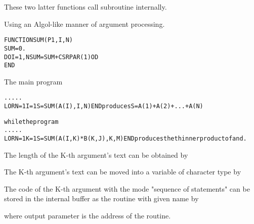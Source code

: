  
These two latter functions call subroutine   internally.
 
\Examples

Using an Algol-like manner of argument processing.

\begin{alltt}
  FUNCTION SUM(P1,I,N)
  SUM=0.
  DO I=1,N  SUM=SUM+CSRPAR(1) OD
  END
\end{alltt}
 
The \COMIS{} main program
\begin{alltt}
  .....
  LORN=1  I=1  S=SUM(A(I),I,N) END  \textrm{produces}  S=A(1)+A(2)+ ... +A(N)

\textrm{while the program}
  .....
  LORN=1  K=1  S=SUM(A(I,K)*B(K,J),K,M) END \textrm{produces the} th \textrm{inner product of}  \textrm{and} .
\end{alltt}
 


The length of the K-th argument's text can be obtained by


The K-th argument's text can be moved into a variable of
character type by


The code of the K-th argument with the mode "sequence of statements"
can be stored in the \COMIS{} internal buffer as the \COMIS{} routine
with given name  by

 
where output parameter  is the address of the \COMIS{} routine.
 
